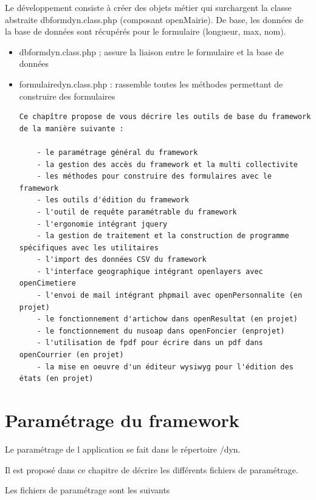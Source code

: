 \documentclass[letterpaper,10pt,french]{manual}
\begin{document}
Le développement consiste à créer des objets métier  qui surchargent la classe abstraite
dbformdyn.class.php (composant openMairie). De base, les données de la base de données sont récupérés pour le
formulaire (longueur, max, nom).
\begin{itemize}
\item {} 
dbformdyn.class.php ; assure la liaison entre le formulaire et la base de données

\item {} 
formulairedyn.class.php : rassemble toutes les méthodes permettant de construire des formulaires

\begin{Verbatim}[commandchars=@\[\]]
Ce chapître propose de vous décrire les outils de base du framework de la manière suivante :

    - le paramétrage général du framework
    - la gestion des accès du framework et la multi collectivite
    - les méthodes pour construire des formulaires avec le framework
    - les outils d'édition du framework
    - l'outil de requête paramétrable du framework
    - l'ergonomie intégrant jquery
    - la gestion de traitement et la construction de programme spécifiques avec les utilitaires
    - l'import des données CSV du framework
    - l'interface geographique intégrant openlayers avec openCimetiere
    - l'envoi de mail intégrant phpmail avec openPersonnalite (en projet)
    - le fonctionnement d'artichow dans openResultat (en projet)
    - le fonctionnement du nusoap dans openFoncier (enprojet)
    - l'utilisation de fpdf pour écrire dans un pdf dans openCourrier (en projet)
    - la mise en oeuvre d'un éditeur wysiwyg pour l'édition des états (en projet)
\end{Verbatim}

\end{itemize}

\resetcurrentobjects
\hypertarget{--doc-framework/parametrage}{}

\hypertarget{parametrage}{}\section{Paramétrage du framework}

Le paramétrage de l application se fait dans le répertoire /dyn.

Il est proposé dans ce chapitre de décrire les différents fichiers de paramétrage.

Les fichiers de paramétrage sont les suivants
\end{document}

